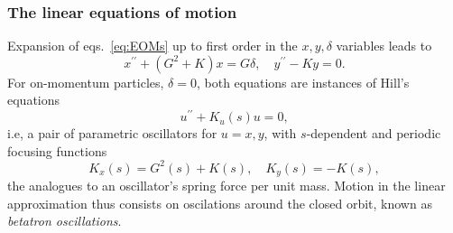 \subsubsection{The linear equations of motion}
Expansion of eqs.~\eqref{eq:EOMs} up to first order in the $x, y, \delta$ variables leads to \cite{sands_physics_1969}
    \begin{equation}
        x^{\prime\prime}+(G^2+K)x=G\delta, \quad
        y^{\prime\prime}-Ky=0.
        \label{eq:linearEOM}
    \end{equation}
    For on-momentum particles, $\delta=0$, both equations are instances of Hill's equations
    \begin{equation}
        u^{\prime\prime}+K_u(s)u = 0,
        \label{eq:Hill}
    \end{equation}
   i.e, a pair of parametric oscillators for $u=x,y$, with $s$-dependent and periodic focusing functions
         $$K_x(s) = G^2(s) + K(s), \quad K_y(s) = - K(s),$$
    the analogues to an oscillator's spring force per unit mass. Motion in the linear approximation thus consists on oscilations around the closed orbit, known as \textit{betatron oscillations}.

